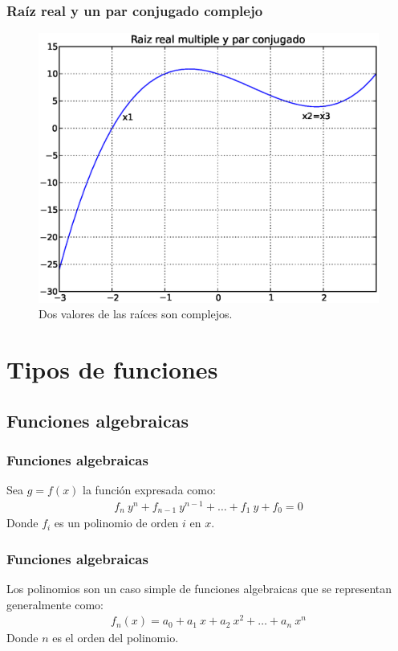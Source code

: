 \documentclass[12pt]{beamer}
\begin{document}
\begin{frame}[fragile]
\frametitle{Raíz real y un par conjugado complejo}
\begin{figure}
	\centering
	\includegraphics[scale=0.4]{Imagenes/raices04.eps} 
	\caption{Dos valores de las raíces son complejos.}
\end{figure}
\end{frame}

\section{Tipos de funciones}
\subsection{Funciones algebraicas}

\begin{frame}
\frametitle{Funciones algebraicas}
Sea $g = f (x)$ la función expresada como:
\pause
\begin{align*}
f_{n} \: y^{n} + f_{n-1} \: y^{n - 1} + \ldots + f_{1} \: y + f_{0} = 0
\end{align*}
Donde $f_{i}$ es un polinomio de orden $i$ en $x$.
\end{frame}
\begin{frame}
\frametitle{Funciones algebraicas}
Los polinomios son un caso simple de funciones algebraicas que se representan generalmente como:
\begin{align*}
f_{n} (x) = a_{0} + a_{1} \: x + a_{2} \: x^{2}+ \ldots +a_{n} \: x^{n}
\end{align*}
Donde $n$ es el orden del polinomio.
\end{frame}
\end{document}
